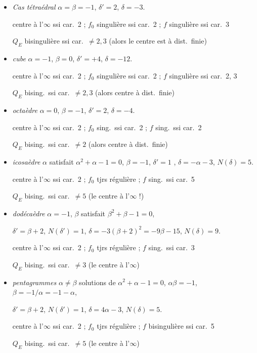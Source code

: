 \documentclass[11pt,a4paper]{article}
\begin{document}
\begin{itemize}
\item \emph{Cas tétraédral} \quad $\alpha = \beta = -1$, \quad $\delta' = 2$, \quad $\delta = -3$.

centre à l'$\infty$ ssi car.\ 2 ; $f_0$ singulière ssi car.\ 2 ; $f$ singulière ssi car.\ 3

$Q_E$ bisingulière ssi car.\ $\neq 2, 3$ (alors le centre est à dist.\ finie)
\item \emph{cube}  \quad $\alpha = -1$, $\beta = 0$, \quad $\delta' = +4$, $\delta = -12$.

centre à l'$\infty$ ssi car.\ 2 ; $f_0$ singulière ssi car.\ 2 ; $f$ singulière ssi car.\ 2, 3

$Q_E$ bising.\ ssi car.\ $\neq 2, 3$ (alors centre à dist.\ finie)
\item \emph{octaèdre} \struck{\ill{}} \quad $\alpha = 0$, $\beta = -1$, \quad $\delta' = 2$, $\delta = -4$.

centre à l'$\infty$ ssi car.\ 2 ; $f_0$ sing.\ ssi car.\ 2 ; $f$ sing.\ ssi car.\ 2

$Q_E$ bising.\ ssi car.\ $\neq 2$ (alors centre à dist.\ finie)
\item \emph{icosaèdre} \quad $\alpha$ satisfait $\alpha^2 + \alpha - 1 = 0$, $\beta = -1$, \quad $\delta' = 1$ \struck{\ill{}}, $\delta = -\alpha - 3$, $N(\delta) = 5$.

centre à l'$\infty$ ssi car.\ 2 ; $f_0$ tjrs régulière ; $f$ sing.\ ssi car.\ 5

$Q_E$ bising.\ ssi car.\ $\neq 5$ (le centre  à l'$\infty$ !)
\item \emph{dodécaèdre} \quad $\alpha = -1$, $\beta$ satisfait \struck{\ill{}} $\beta^2 + \beta - 1 = 0$,


$\delta' = \beta + 2$, $N(\delta') = 1$, \quad $\delta = -3(\beta+2)^2 = -9\beta - 15$, $N(\delta) = 9$.

centre à l'$\infty$ ssi car.\ 2 ; $f_0$ tjrs régulière ; $f$ sing.\ ssi car.\ 3

$Q_E$ bising.\ ssi car.\ $\neq 3$ (le centre  à l'$\infty$)
\item \emph{pentagrammes} \quad $\alpha \neq \beta$ solutions de $\alpha^2 + \alpha - 1 = 0$, $\alpha\beta = -1$, $\beta = -1/\alpha = -1-\alpha$,

$\delta' = \beta + 2$, $N(\delta') = 1$, \quad $\delta = 4\alpha - 3$, $N(\delta) = 5$.

centre à l'$\infty$ ssi car.\ 2 ; $f_0$ tjrs régulière ; $f$ bisingulière ssi car.\ 5

$Q_E$ bising.\ ssi car.\ $\neq 5$ (le centre  à l'$\infty$)
\end{itemize}
\end{document}
